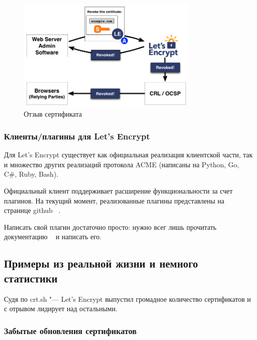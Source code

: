 \documentclass[10pt, a5paper]{article}
\begin{document}
\begin{figure}[h!]
  \centering
  \includegraphics[height=5.5cm]{w_03_2016_Kharkevich10.png}
\caption*{Отзыв сертификата}\label{fig:Kharkevich10}
\end{figure}


\subsubsection*{Клиенты/плагины для Let's Encrypt}

Для Let’s Encrypt существует как официальная реализация клиентской части, так и множество других реализаций протокола \linebreak ACME (написаны на Python, Go, C\#, Ruby, Bash).

Официальный клиент поддерживает расширение функциональности за счет плагинов. На текущий момент, реализованные плагины представлены на странице github ~\cite{Kharkevich5}.

Написать свой плагин достаточно просто: нужно всег лишь прочитать документацию ~\cite{Kharkevich6} и написать его.

\subsection*{Примеры из реальной жизни и немного статистики}

Судя по crt.sh "--- Let's Encrypt выпустил громадное количество сертификатов и с отрывом лидирует над остальными.



\subsubsection*{Забытые обновления сертификатов}
\end{document}
